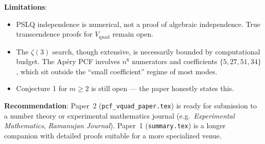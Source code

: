 \documentclass[11pt,a4paper]{article}
\begin{document}
\textbf{Limitations}:
\begin{itemize}
\item PSLQ independence is numerical, not a proof of algebraic independence.  True transcendence proofs for $V_{\mathrm{quad}}$ remain open.
\item The $\zeta(3)$ search, though extensive, is necessarily bounded by computational budget.  The Ap\'ery PCF involves $n^6$ numerators and coefficients $\{5, 27, 51, 34\}$, which sit outside the ``small coefficient'' regime of most modes.
\item Conjecture 1 for $m \ge 2$ is still open — the paper honestly states this.
\end{itemize}

\textbf{Recommendation}: Paper~2 (\texttt{pcf\_vquad\_paper.tex}) is ready for submission to a number theory or experimental mathematics journal (e.g.\ \emph{Experimental Mathematics}, \emph{Ramanujan Journal}).  Paper~1 (\texttt{summary.tex}) is a longer companion with detailed proofs suitable for a more specialized venue.
\end{document}
